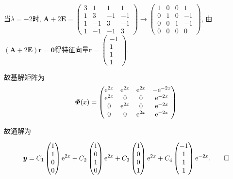 \begin{solve}
当$\lambda=-2$时, $\bm{A}+2\bm{E}=\begin{pmatrix}3&1&1&1\\1&3&-1&-1\\1&-1&3&-1\\1&-1&-1&3\end{pmatrix}\to\begin{pmatrix}1&0&0&1\\0&1&0&-1\\0&0&1&-1\\0&0&0&0\end{pmatrix}$, 
由$(\bm{A}+2\bm{E})\bm{r}=\bm{0}$得特征向量$\bm{r}=\begin{pmatrix}-1\\1\\1\\1\end{pmatrix}$.

故基解矩阵为
\[\bm{\varPhi}(x)=\begin{pmatrix}\mathrm{e}^{2x}&\mathrm{e}^{2x}&\mathrm{e}^{2x}&-\mathrm{e}^{-2x}\\\mathrm{e}^{2x}&0&0&\mathrm{e}^{-2x}\\0&\mathrm{e}^{2x}&0&\mathrm{e}^{-2x}\\0&0&\mathrm{e}^{2x}&\mathrm{e}^{-2x}\end{pmatrix}\]

故通解为

\[\bm{y}=C_1\begin{pmatrix}1\\1\\0\\0\end{pmatrix}\mathrm{e}^{2x}+C_2\begin{pmatrix}1\\0\\1\\0\end{pmatrix}\mathrm{e}^{2x}+C_3\begin{pmatrix}1\\0\\0\\1\end{pmatrix}\mathrm{e}^{2x}+C_4\begin{pmatrix}-1\\1\\1\\1\end{pmatrix}\mathrm{e}^{-2x}.\qedhere\]
\end{solve}


